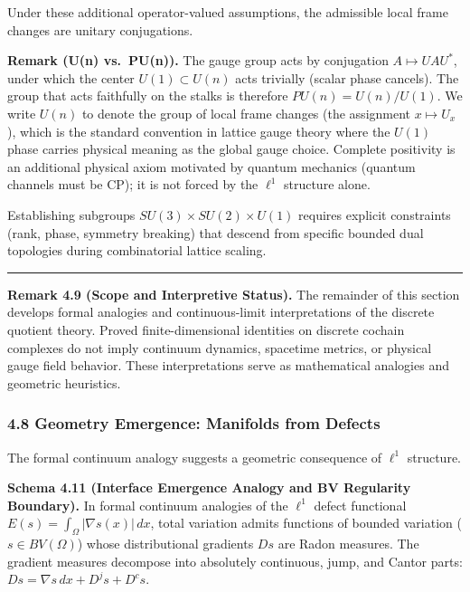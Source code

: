 \documentclass[
]{article}
\renewenvironment{quote}
  {\begin{leftbar}\small}
  {\end{leftbar}}
\begin{document}
Under these additional operator-valued assumptions, the admissible local
frame changes are unitary conjugations.

\textbf{Remark (U(n) vs.~PU(n)).} The gauge group acts by conjugation \(A \mapsto UAU^*\), under which the center \(U(1) \subset U(n)\) acts trivially (scalar phase cancels). The group that acts faithfully on the stalks is therefore \(PU(n) = U(n)/U(1)\). We write \(U(n)\) to denote the group of local frame changes (the assignment \(x \mapsto U_x\)), which is the standard convention in lattice gauge theory where the \(U(1)\) phase carries physical meaning as the global gauge choice. Complete positivity is an additional physical axiom motivated by quantum mechanics (quantum channels must be CP); it is not forced by the \(\ell^1\) structure alone.

Establishing subgroups \(SU(3) \times SU(2) \times U(1)\) requires explicit constraints (rank, phase, symmetry breaking) that descend from specific bounded dual topologies during combinatorial lattice scaling.

\begin{center}\rule{0.5\linewidth}{0.5pt}\end{center}

\begin{quote}
\textbf{Remark 4.9 (Scope and Interpretive Status).} The remainder of this section develops formal analogies and continuous-limit interpretations of the discrete quotient theory. Proved finite-dimensional identities on discrete cochain complexes do not imply continuum dynamics, spacetime metrics, or physical gauge field behavior. These interpretations serve as mathematical analogies and geometric heuristics.
\end{quote}

\subsubsection{4.8 Geometry Emergence: Manifolds from Defects}\label{geometry-emergence-manifolds-from-defects}

The formal continuum analogy suggests a geometric consequence of \(\ell^1\) structure.

\textbf{Schema 4.11 (Interface Emergence Analogy and BV Regularity Boundary).} In formal continuum analogies of the \(\ell^1\) defect functional \(E(s) = \int_\Omega |\nabla s(x)| \, dx\), total variation admits functions of bounded variation (\(s \in BV(\Omega)\)) whose distributional gradients \(Ds\) are Radon measures. The gradient measures decompose into absolutely continuous, jump, and Cantor parts: \(Ds = \nabla s \, dx + D^j s + D^c s\).
\end{document}
